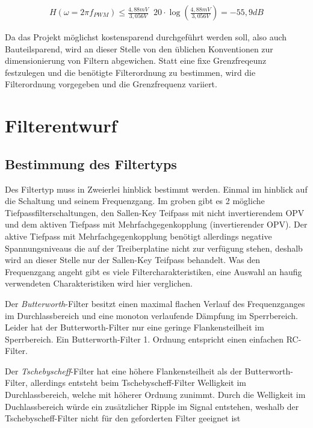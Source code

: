\begin{align}
H(\omega=2\pi f_{PWM}) \le \frac{4,88mV}{3,056V} \mathop{\hat{=}} 20\cdot\log(\frac{4,88mV}{3,056V})= -55,9 dB
\label{eq:daempfung}
\end{align}

Da das Projekt möglichst kostensparend durchgeführt werden soll, also auch Bauteilsparend, wird an dieser Stelle von den üblichen Konventionen zur dimensionierung von Filtern abgewichen.
Statt eine fixe Grenzfreqeunz festzulegen und die benötigte Filterordnung zu bestimmen, wird die Filterordnung vorgegeben und die Grenzfrequenz variiert.

\section{Filterentwurf}

\subsection{Bestimmung des Filtertyps}

Des Filtertyp muss in Zweierlei hinblick bestimmt werden. Einmal im hinblick auf die Schaltung und seinem Frequenzgang.
Im groben gibt es 2 mögliche Tiefpassfilterschaltungen, den Sallen-Key Teifpass mit nicht invertierendem OPV und dem aktiven Tiefpass mit Mehrfachgegenkopplung 
(invertierender OPV). Der aktive Tiefpass mit Mehrfachgegenkopplung benötigt allerdings negative Spannungsniveaus die auf der Treiberplatine nicht zur
verfügung stehen, deshalb wird an dieser Stelle nur der Sallen-Key Teifpass behandelt.
Was den Frequenzgang angeht gibt es viele Filtercharakteristiken, eine Auswahl an haufig verwendeten Charakteristiken wird hier verglichen.

Der \emph{Butterworth}-Filter besitzt einen maximal flachen Verlauf des Frequenzganges im Durchlassbereich und eine monoton verlaufende Dämpfung im Sperrbereich.
Leider hat der Butterworth-Filter nur eine geringe Flankensteilheit im Sperrbereich. Ein Butterworth-Filter 1. Ordnung entspricht einen  einfachen RC-Filter.

Der \emph{Tschebyscheff}-Filter hat eine höhere Flankensteilheit als der Butterworth-Filter, allerdings entsteht beim Tschebyscheff-Filter Welligkeit im Durchlassbereich,
welche mit höherer Ordnung zunimmt. Durch die Welligkeit im Duchlassbereich würde ein zusätzlicher Ripple im Signal entstehen, weshalb der Tschebyscheff-Filter nicht
für den geforderten Filter geeignet ist 

